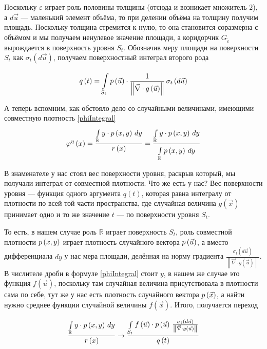 Поскольку $\varepsilon$ играет роль половины толщины
(отсюда и возникает множитель $2$),
а $d\vec{u}$ --- маленький элемент объёма,
то при делении объёма на толщину получим площадь.
Поскольку толщина стремится к нулю,
то она становится соразмерна с объёмом и мы получаем ненулевое значение площади,
а коридорчик $G_{\tilde{\varepsilon}}$ вырождается в поверхность уровня $S_t$.
Обозначив меру площади на поверхности $S_t$ как
$\sigma_{t}\left( d\vec{u} \right)$,
получаем поверхностный интеграл второго рода

$$q\left( t \right)
    = \integrall{S_t}{\sigma_{t}\left(d\vec{u} \right)}{
        \pdf{\vec{u}} \cdot \frac{1}
            {\left\| \vec{\nabla} \cdot g\left( \vec{u} \right) \right\|}}$$

А теперь вспомним, как обстояло дело со случайными величинами,
имеющими совместную плотность \eqref{phiIntegral}
$$\varphi^{\eta}\left( x \right)
    = \frac{\integral{\mathbb{R}}{}{y}{y \cdot \pdf{x,y}}}
        {r\left( x \right)}
    = \frac{\integral{\mathbb{R}}{}{y}{y \cdot \pdf{x,y}}}
        {\integral{\mathbb{R}}{}{y}{\pdf{x,y}}}$$

В знаменателе у нас стоял вес поверхности уровня,
раскрыв который, мы получали интеграл от совместной плотности.
Что же есть у нас?
Вес поверхности уровня --- функция одного аргумента $q\left( t \right)$,
которая равна интегралу от плотности по всей той части пространства,
где случайная величина $g\left( \vec{x} \right)$
принимает одно и то же значение $t$ --- по поверхности уровня $S_t$.

То есть, в нашем случае роль $\mathbb{R}$ играет поверхность $S_t$,
роль совместной плотности $\pdf{x,y}$ играет плотность случайного вектора
$\pdf{\vec{u}}$, а вместо дифференциала $dy$ у нас мера площади,
делённая на норму градиента $\frac{\sigma_{t}\left( d\vec{u} \right)}
{\left\| \vec{\nabla} \cdot g\left( \vec{u} \right) \right\|}$.
В числителе дроби в формуле \eqref{phiIntegral} стоит $y$,
в нашем же случае это функция $f\left( \vec{u} \right)$,
поскольку там случайная величина присутствовала в плотности сама по себе,
тут же у нас есть плотность случайного вектора $\pdf{\vec{x}}$,
а найти нужно среднее функции случайной величины $f\left( \vec{x} \right)$.
Итого, получается переход

$$\frac{\integral{\mathbb{R}}{}{y}{y \cdot \pdf{x,y}}}{r\left( x \right)}
    \rightarrow
        \frac{\integrall{S_t}{\frac{\sigma_{t}\left( d\vec{u} \right)}{
            \left\| \vec{\nabla} \cdot g\left( \vec{u} \right) \right\|}}{
            f\left( \vec{u} \right) \cdot \pdf{\vec{u}}}}{q\left( t \right)}$$

